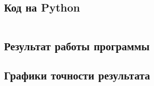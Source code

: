 \documentclass[a4paper,12pt]{article}
\newenvironment{longlisting}{\captionsetup{type=listing}}{}
\begin{document}
\subsection{Код на Python}

\begin{longlisting}
\inputminted{python}{src/series_fixed_precision.py}
\end{longlisting}

\subsection{Результат работы программы}
\begin{longlisting}

\end{longlisting}

\subsection{Графики точности результата}
\end{document}
